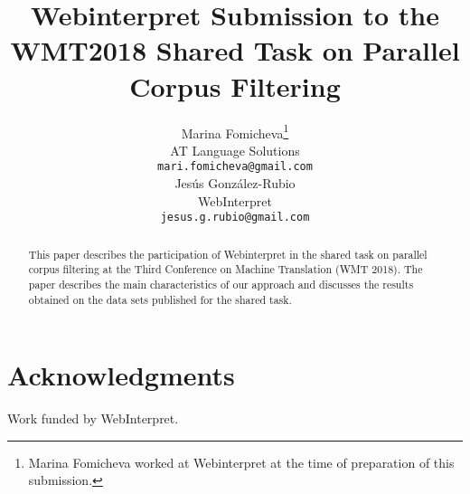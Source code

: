 \documentclass[11pt,a4paper]{article}
\title{Webinterpret Submission to the\\WMT2018 Shared Task on Parallel Corpus Filtering}
\author{Marina Fomicheva\thanks{Marina Fomicheva worked at Webinterpret at the time of preparation of this submission.} \\
  AT Language Solutions \\
  {\tt mari.fomicheva@gmail.com} \\\And
  Jes\'us Gonz\'alez-Rubio \\
  WebInterpret\\
  {\tt jesus.g.rubio@gmail.com} \\}
\date{}
\begin{document}
\maketitle
\begin{abstract}
  This paper describes the participation of Webinterpret in the shared task on parallel corpus filtering at the Third Conference on Machine Translation (WMT 2018). The paper describes the main characteristics of our approach and discusses the results obtained on the data sets published for the shared task.
\end{abstract}








\section*{Acknowledgments}
Work funded by WebInterpret.




\end{document}
